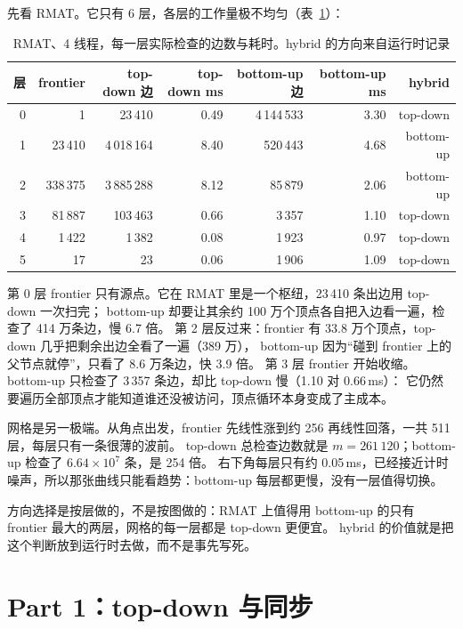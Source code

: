 \documentclass[11pt,a4paper]{ctexart}
\begin{document}
先看 RMAT。它只有 6 层，各层的工作量极不均匀（表~\ref{tab:levels}）：

\begin{table}[H]
\centering
\caption{RMAT、4 线程，每一层实际检查的边数与耗时。hybrid 的方向来自运行时记录}
\label{tab:levels}
\small
\begin{tabular}{rrrrrrr}
\toprule
层 & frontier & top-down 边 & top-down ms & bottom-up 边 & bottom-up ms & hybrid \\
\midrule
0 & 1 & 23\,410 & 0.49 & 4\,144\,533 & 3.30 & top-down \\
1 & 23\,410 & 4\,018\,164 & 8.40 & 520\,443 & 4.68 & bottom-up \\
2 & 338\,375 & 3\,885\,288 & 8.12 & 85\,879 & 2.06 & bottom-up \\
3 & 81\,887 & 103\,463 & 0.66 & 3\,357 & 1.10 & top-down \\
4 & 1\,422 & 1\,382 & 0.08 & 1\,923 & 0.97 & top-down \\
5 & 17 & 23 & 0.06 & 1\,906 & 1.09 & top-down \\
\bottomrule
\end{tabular}
\end{table}

第 0 层 frontier 只有源点。它在 RMAT 里是一个枢纽，23\,410 条出边用 top-down 一次扫完；
bottom-up 却要让其余约 100 万个顶点各自把入边看一遍，检查了 414 万条边，慢 6.7 倍。
第 2 层反过来：frontier 有 33.8 万个顶点，top-down 几乎把剩余出边全看了一遍（389 万），
bottom-up 因为``碰到 frontier 上的父节点就停''，只看了 8.6 万条边，快 3.9 倍。
第 3 层 frontier 开始收缩。bottom-up 只检查了 3\,357 条边，却比 top-down 慢（1.10 对 0.66\,ms）：
它仍然要遍历全部顶点才能知道谁还没被访问，顶点循环本身变成了主成本。

网格是另一极端。从角点出发，frontier 先线性涨到约 256 再线性回落，一共 511 层，每层只有一条很薄的波前。
top-down 总检查边数就是 $m=261\,120$；bottom-up 检查了 $6.64\times 10^7$ 条，是 254 倍。
右下角每层只有约 0.05\,ms，已经接近计时噪声，所以那张曲线只能看趋势：bottom-up 每层都更慢，没有一层值得切换。

\begin{findingbox}[：层级]
方向选择是按层做的，不是按图做的：RMAT 上值得用 bottom-up 的只有 frontier 最大的两层，网格的每一层都是 top-down 更便宜。
hybrid 的价值就是把这个判断放到运行时去做，而不是事先写死。
\end{findingbox}

\section{Part 1：top-down 与同步}
\label{sec:td}
\end{document}
